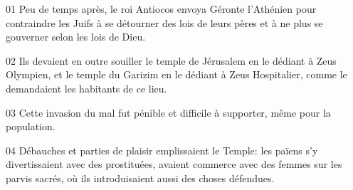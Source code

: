 01 Peu de temps après, le roi Antiocos envoya Géronte l’Athénien pour contraindre les Juifs à se détourner des lois de leurs pères et à ne plus se gouverner selon les lois de Dieu.

02 Ils devaient en outre souiller le temple de Jérusalem en le dédiant à Zeus Olympien, et le temple du Garizim en le dédiant à Zeus Hospitalier, comme le demandaient les habitants de ce lieu.

03 Cette invasion du mal fut pénible et difficile à supporter, même pour la population.

04 Débauches et parties de plaisir emplissaient le Temple: les païens s’y divertissaient avec des prostituées, avaient commerce avec des femmes sur les parvis sacrés, où ils introduisaient aussi des choses défendues.
